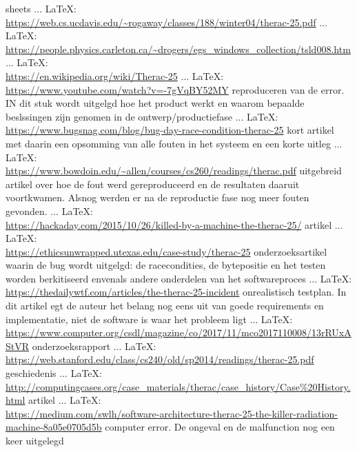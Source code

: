 \begin{thebibliography}{99}
sheets
 ... \LaTeX:\\ \url{https://web.cs.ucdavis.edu/~rogaway/classes/188/winter04/therac-25.pdf}
 ... \LaTeX:\\ \url{https://people.physics.carleton.ca/~drogers/egs_windows_collection/tsld008.htm}
 ... \LaTeX:\\ \url{https://en.wikipedia.org/wiki/Therac-25}
 ... \LaTeX:\\ \url{https://www.youtube.com/watch?v=-7gVqBY52MY}
reproduceren van de error. IN dit stuk wordt uitgelgd hoe het product werkt en waarom bepaalde beslssingen zijn genomen in de ontwerp/productiefase
 ... \LaTeX:\\ \url{https://www.bugsnag.com/blog/bug-day-race-condition-therac-25}
kort artikel met daarin een opsomming van alle fouten in het systeem en een korte uitleg
 ... \LaTeX:\\ \url{https://www.bowdoin.edu/~allen/courses/cs260/readings/therac.pdf}
uitgebreid artikel over hoe de fout werd gereproduceerd en de resultaten daaruit voortkwamen. Alsnog werden er na de reproductie fase nog meer fouten gevonden.
 ... \LaTeX:\\ \url{https://hackaday.com/2015/10/26/killed-by-a-machine-the-therac-25/}
artikel
 ... \LaTeX:\\ \url{https://ethicsunwrapped.utexas.edu/case-study/therac-25}
onderzoeksartikel waarin de bug wordt uitgelgd: de racecondities, de bytepositie en het testen worden berkitiseerd envenals andere onderdelen van het softwareproces
 ... \LaTeX:\\ \url{https://thedailywtf.com/articles/the-therac-25-incident}
onrealistisch testplan. In dit artikel egt de auteur het belang nog eens uit van goede requirements en implementatie, niet de software is waar het probleem ligt
 ... \LaTeX:\\ \url{https://www.computer.org/csdl/magazine/co/2017/11/mco2017110008/13rRUxAStVR}
onderzoeksrapport
 ... \LaTeX:\\ \url{https://web.stanford.edu/class/cs240/old/sp2014/readings/therac-25.pdf}
geschiedenis
 ... \LaTeX:\\ \url{http://computingcases.org/case_materials/therac/case_history/Case%20History.html}
artikel
 ... \LaTeX:\\ \url{https://medium.com/swlh/software-architecture-therac-25-the-killer-radiation-machine-8a05e0705d5b}
computer error. De ongeval en de malfunction nog een keer uitgelegd

\end{thebibliography}
